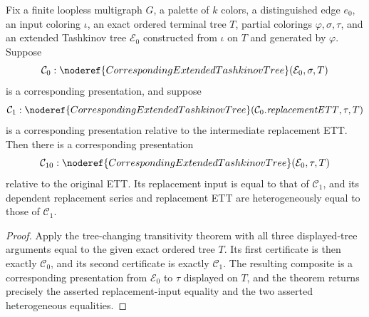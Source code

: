 \begin{lemma}
Fix a finite loopless multigraph \(G\), a palette of \(k\) colors, a
distinguished edge \(e_0\), an input coloring \(\iota\), an exact ordered
terminal tree \(T\), partial colorings \(\varphi,\sigma,\tau\), and an
extended Tashkinov tree \(\mathcal E_0\) constructed from \(\iota\) on
\(T\) and generated by \(\varphi\).  Suppose
\[
 \mathcal C_0:
 \noderef{CorrespondingExtendedTashkinovTree}
   (\mathcal E_0,\sigma,T)
\]
is a corresponding presentation, and suppose
\[
 \mathcal C_1:
 \noderef{CorrespondingExtendedTashkinovTree}
   (\mathcal C_0.\mathit{replacementETT},\tau,T)
\]
is a corresponding presentation relative to the intermediate replacement
ETT.  Then there is a corresponding presentation
\[
 \mathcal C_{10}:
 \noderef{CorrespondingExtendedTashkinovTree}
   (\mathcal E_0,\tau,T)
\]
relative to the original ETT.  Its replacement input is equal to that of
\(\mathcal C_1\), and its dependent replacement series and replacement ETT
are heterogeneously equal to those of \(\mathcal C_1\).
\end{lemma}
\begin{proof}
Apply the tree-changing transitivity theorem
 with all three
displayed-tree arguments equal to the given exact ordered tree \(T\).
Its first certificate is then exactly \(\mathcal C_0\), and its second
certificate is exactly \(\mathcal C_1\).  The resulting composite is a
corresponding presentation from \(\mathcal E_0\) to \(\tau\) displayed on
\(T\), and the theorem returns precisely the asserted replacement-input
equality and the two asserted heterogeneous equalities.
\end{proof}
